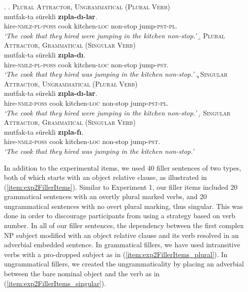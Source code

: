 \documentclass[doc,a4paper,man,natbib,floatsintext,noextraspace]{apa6}\usepackage[]{graphicx}\usepackage[]{color}
\begin{document}
\ex. \label{item:exp2ExperimentalItems}
%
\a. \textsc{Plural Attractor, Ungrammatical (Plural Verb)}\label{item:exp2expitem-plpl}\\ 
   mutfak-ta sürekli \textbf{zıpla-dı-lar}.\\ 
  hire-\textsc{nmlz}-\textsc{pl}-\textsc{poss}  cook kitchen-\textsc{loc} non-stop  jump-\textsc{pst}-\textsc{pl}.\\
  \glt \textit{`The cook that they hired were jumping in the kitchen non-stop.'}
%
\b. \textsc{Plural Attractor, Grammatical (Singular Verb)}\label{item:exp2expitem-plsg}\\ 
   mutfak-ta sürekli \textbf{zıpla-dı}.\\ 
  hire-\textsc{nmlz}-\textsc{pl}-\textsc{poss}  cook kitchen-\textsc{loc} non-stop  jump-\textsc{pst}.\\
  \glt \textit{`The cook that they hired was jumping in the kitchen non-stop.'}
%
\c. \textsc{Singular Attractor, Ungrammatical (Plural Verb)}\label{item:exp2expitem-sgpl}\\
   mutfak-ta sürekli \textbf{zıpla-dı-lar}.\\ 
  hire-\textsc{nmlz}-\textsc{poss}  cook kitchen-\textsc{loc} non-stop  jump-\textsc{pst}-\textsc{pl}.\\
  \glt \textit{`The cook that they hired were jumping in the kitchen non-stop.'}
%
\d. \textsc{Singular Attractor, Grammatical (Singular Verb)}\label{item:exp2expitem-sgsg}\\ 
   mutfak-ta sürekli \textbf{zıpla-fı}.\\ 
  hire-\textsc{nmlz}-\textsc{poss}  cook kitchen-\textsc{loc} non-stop  jump-\textsc{pst}.\\
  \glt \textit{`The cook that they hired was jumping in the kitchen non-stop.'}

In addition to the experimental items, we used 40 filler sentences of two types, both of which starts with an object relative clause, as illustrated in (\ref{item:exp2FillerItems}). Similar to Experiment 1, our filler items included 20 grammatical sentences with an overtly plural marked verbs, and 20 ungrammatical sentences with no overt plural marking, thus singular. 
This was done in order to discourage participants from using a strategy based on verb number. 
In all of our filler sentences, the dependency between the first complex NP subject modified with an object relative clause and its verb resolved in an adverbial embedded sentence. 
In grammatical fillers, we have used intransitive verbs with a pro-dropped subject as in (\ref{item:exp2FillerItems_plural}). 
In ungrammatical fillers, we created the ungrammaticality by placing an adverbial between the bare nominal object and the verb as in (\ref{item:exp2FillerItems_singular}). 
\end{document}
